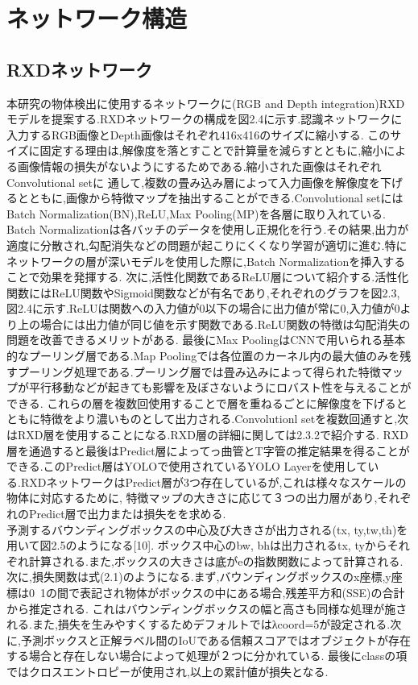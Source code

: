 \section{ネットワーク構造}
\subsection{RXDネットワーク}

本研究の物体検出に使用するネットワークに(RGB and Depth integration)RXDモデルを提案する.RXDネットワークの構成を図2.4に示す.認識ネットワークに入力するRGB画像とDepth画像はそれぞれ416x416のサイズに縮小する.
このサイズに固定する理由は,解像度を落とすことで計算量を減らすとともに,縮小による画像情報の損失がないようにするためである.縮小された画像はそれぞれConvolutional setに
通して,複数の畳み込み層によって入力画像を解像度を下げるとともに,画像から特徴マップを抽出することができる.Convolutional setにはBatch Normalization(BN),ReLU,Max Pooling(MP)を各層に取り入れている.
Batch Normalizationは各バッチのデータを使用し正規化を行う.その結果,出力が適度に分散され,勾配消失などの問題が起こりにくくなり学習が適切に進む.特にネットワークの層が深いモデルを使用した際に,Batch Normalizationを挿入することで効果を発揮する.
次に,活性化関数であるReLU層について紹介する.活性化関数にはReLU関数やSigmoid関数などが有名であり,それぞれのグラフを図2.3, 図2.4に示す.ReLUは関数への入力値が0以下の場合に出力値が常に0,入力値が0より上の場合には出力値が同じ値を示す関数である.ReLU関数の特徴は勾配消失の問題を改善できるメリットがある.
最後にMax PoolingはCNNで用いられる基本的なプーリング層である.Map Poolingでは各位置のカーネル内の最大値のみを残すプーリング処理である.プーリング層では畳み込みによって得られた特徴マップが平行移動などが起きても影響を及ぼさないようにロバスト性を与えることができる.
これらの層を複数回使用することで層を重ねるごとに解像度を下げるとともに特徴をより濃いものとして出力される.Convolutionl setを複数回通すと,次はRXD層を使用することになる.RXD層の詳細に関しては2.3.2で紹介する.
RXD層を通過すると最後はPredict層によってっ曲管とT字管の推定結果を得ることができる.このPredict層はYOLOで使用されているYOLO Layerを使用している.RXDネットワークはPredict層が3つ存在しているが,これは様々なスケールの物体に対応するために,
特徴マップの大きさに応じて３つの出力層があり,それぞれのPredict層で出力または損失をを求める.\\
予測するバウンディングボックスの中心及び大きさが出力される(tx, ty,tw,th)を用いて図2.5のようになる[10].
ボックス中心のbw, bhは出力されるtx, tyからそれぞれ計算される.また,ボックスの大きさは底がeの指数関数によって計算される.
次に,損失関数は式(2.1)のようになる.まず,バウンディングボックスのx座標,y座標は0~1の間で表記され物体がボックスの中にある場合,残差平方和(SSE)の合計から推定される.
これはバウンディングボックスの幅と高さも同様な処理が施される.また,損失を生みやすくするためデフォルトではλcoord=5が設定される.次に,予測ボックスと正解ラベル間のIoUである信頼スコアではオブジェクトが存在する場合と存在しない場合によって処理が２つに分かれている.
最後にclassの項ではクロスエントロピーが使用され,以上の累計値が損失となる.




